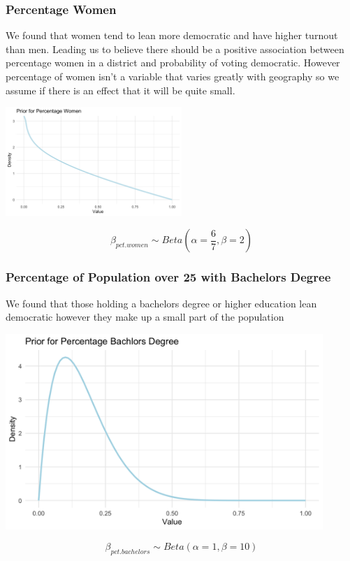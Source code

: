 \documentclass{beamer}
\begin{document}
\begin{frame}
  \frametitle{Percentage Women}
  We found that women tend to lean more democratic and have higher turnout than men. Leading us to believe there should be a positive association between percentage women in a district and probability of voting democratic. 
  However percentage of women isn't a variable that varies greatly with geography so we assume if there is an effect that it will be quite small.  
  \begin{center}
    \includegraphics[width=0.5\textwidth]{plots/prior_pct.women.png}
  \end{center}
  
  $$ \beta_{pct.women} \sim Beta(\alpha = \frac{6}{7}, \beta = 2) $$
\end{frame}

\begin{frame}
  \frametitle{Percentage of Population over 25 with Bachelors Degree}
  We found that those holding a bachelors degree or higher education lean democratic however they make up a small part of the population 
  \begin{center}
    \includegraphics[width=0.9\textwidth]{plots/prior_pct.bachelors.png}
  \end{center}
  

  $$  \beta_{pct.bachelors} \sim Beta( \alpha = 1 , \beta = 10 )$$
\end{frame}
\end{document}
